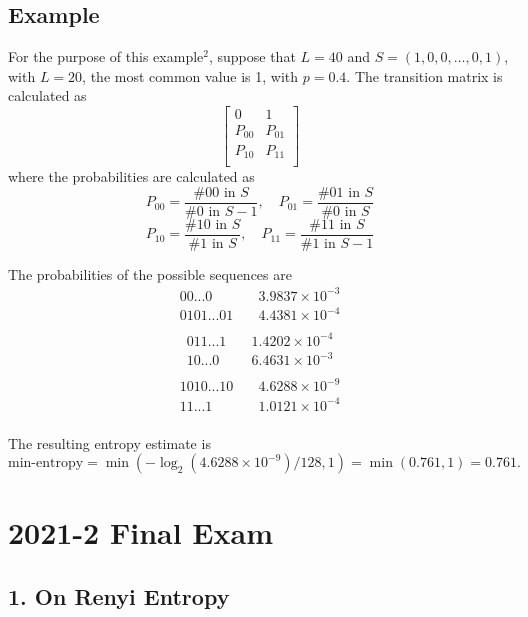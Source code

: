 \documentclass[12pt,openany]{book}
\theoremstyle{definition}
\begin{document}
\section*{Example}
For the purpose of this example\(^2\), suppose that \(L = 40\) and \(S = (1, 0, 0, \ldots, 0, 1)\), with \(L = 20\), the most common value is 1, with \(p = 0.4\). The transition matrix is calculated as
\[
\begin{bmatrix}
	0 & 1 \\
	P_{00} & P_{01} \\
	P_{10} & P_{11} \\
\end{bmatrix}
\]
where the probabilities are calculated as
\[
P_{00} = \frac{\#00 \text{ in } S}{\#0 \text{ in } S - 1}, \quad P_{01} = \frac{\#01 \text{ in } S}{\#0 \text{ in } S}
\]
\[
P_{10} = \frac{\#10 \text{ in } S}{\#1 \text{ in } S}, \quad P_{11} = \frac{\#11 \text{ in } S}{\#1 \text{ in } S - 1}
\]

The probabilities of the possible sequences are
\[
\begin{aligned}
	00...0 &\quad 3.9837 \times 10^{-3} \\
	0101...01 &\quad 4.4381 \times 10^{-4} \\
\end{aligned}
\]
\[
\begin{aligned}
	011...1 &\quad 1.4202 \times 10^{-4} \\
	10...0 &\quad 6.4631 \times 10^{-3} \\
\end{aligned}
\]
\[
\begin{aligned}
	1010...10 &\quad 4.6288 \times 10^{-9} \\
	11...1 &\quad 1.0121 \times 10^{-4} \\
\end{aligned}
\]

The resulting entropy estimate is
\[ \text{min-entropy} = \min(-\log_2(4.6288 \times 10^{-9})/128, 1) = \min(0.761, 1) = 0.761. \]

\newpage

\chapter{2021-2 Final Exam}


\section*{1. On Renyi Entropy}
\end{document}
